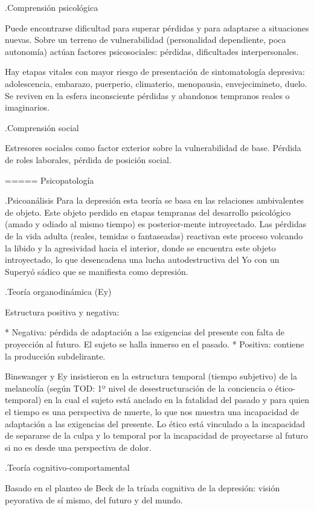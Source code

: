 \documentclass[encares.tex]{subfiles}
\begin{document}
.Comprensión psicológica

Puede encontrarse dificultad para superar pérdidas y para adaptarse a situaciones nuevas. Sobre un terreno de vulnerabilidad (personalidad dependiente, poca autonomía) actúan factores psicosociales: pérdidas, dificultades interpersonales.

Hay etapas vitales con mayor riesgo de presentación de sintomatología depresiva: adolescencia, embarazo, puerperio, climaterio, menopausia, envejecimineto, duelo. Se reviven en la esfera inconsciente pérdidas y abandonos tempranos reales o imaginarios.

.Comprensión social

Estresores sociales como factor exterior sobre la vulnerabilidad de base. Pérdida de roles laborales, pérdida de posición social.

===== Psicopatología

.Psicoanálisis
Para la depresión esta teoría se basa en las relaciones ambivalentes de objeto. Este objeto perdido en etapas tempranas del desarrollo psicológico (amado y odiado al mismo tiempo) es posterior-mente introyectado. Las pérdidas de la vida adulta (reales, temidas o fantaseadas) reactivan este proceso volcando la libido y la agresividad hacia el interior, donde se encuentra este objeto introyectado, lo que desencadena una lucha autodestructiva del Yo con un Superyó sádico que se manifiesta como depresión.

.Teoría organodinámica (Ey)

Estructura positiva y negativa:

* Negativa: pérdida de adaptación a las exigencias del presente con falta de proyección al futuro. El sujeto se halla inmerso en el pasado.
* Positiva: contiene la producción subdelirante.

Binswanger y Ey insistieron en la estructura temporal (tiempo subjetivo) de la melancolía (según TOD: 1º nivel de desestructuración de la conciencia o ético-temporal) en la cual el sujeto está anclado en la fatalidad del pasado y para quien el tiempo es una perspectiva de muerte, lo que nos muestra una incapacidad de adaptación a las exigencias del presente. Lo ético está vinculado a la incapacidad de separarse de la culpa y lo temporal por la incapacidad de proyectarse al futuro si no es desde una perspectiva de dolor.

.Teoría cognitivo-comportamental

Basado en el planteo de Beck de la tríada cognitiva de la depresión: visión peyorativa de sí mismo, del futuro y del mundo.
\end{document}
